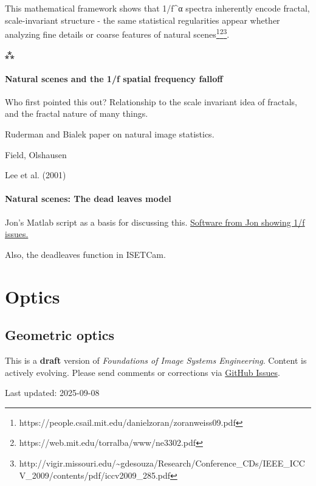 \documentclass[
  letterpaper,
]{book}
\begin{document}
This mathematical framework shows that 1/f\^{}α spectra inherently
encode fractal, scale-invariant structure - the same statistical
regularities appear whether analyzing fine details or coarse features of
natural scenes\footnote{https://people.csail.mit.edu/danielzoran/zoranweiss09.pdf}\footnote{https://web.mit.edu/torralba/www/ne3302.pdf}\footnote{http://vigir.missouri.edu/\textasciitilde gdesouza/Research/Conference\_CDs/IEEE\_ICCV\_2009/contents/pdf/iccv2009\_285.pdf}.

⁂

\subsection{Natural scenes and the 1/f spatial frequency
falloff}\label{natural-scenes-and-the-1f-spatial-frequency-falloff}

Who first pointed this out? Relationship to the scale invariant idea of
fractals, and the fractal nature of many things.

Ruderman and Bialek paper on natural image statistics.

Field, Olshausen

Lee et al. (2001)

\subsection{Natural scenes: The dead leaves
model}\label{natural-scenes-the-dead-leaves-model}

Jon's Matlab script as a basis for discussing this.
\href{https://github.com/isetbio/isetbio/blob/main/scripts/oneoverf/s_oneOverF1D.m}{Software
from Jon showing 1/f issues.}

Also, the deadleaves function in ISETCam.

\part{Optics}

\chapter{Geometric optics}\label{sec-geometric-optics}

\begin{tcolorbox}[enhanced jigsaw, opacityback=0, breakable, coltitle=black, leftrule=.75mm, left=2mm, colframe=quarto-callout-warning-color-frame, opacitybacktitle=0.6, bottomtitle=1mm, bottomrule=.15mm, toprule=.15mm, title=\textcolor{quarto-callout-warning-color}{\faExclamationTriangle}\hspace{0.5em}{Work in Progress}, titlerule=0mm, toptitle=1mm, colback=white, rightrule=.15mm, colbacktitle=quarto-callout-warning-color!10!white, arc=.35mm]

This is a \textbf{draft} version of \emph{Foundations of Image Systems
Engineering}. Content is actively evolving. Please send comments or
corrections via \href{https://github.com/wandell/FISE-git/issues}{GitHub
Issues}.

Last updated: 2025-09-08

\end{tcolorbox}
\end{document}
